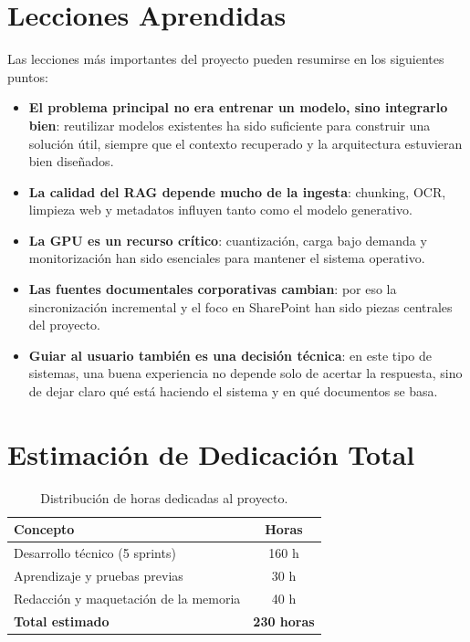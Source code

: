 \section{Lecciones Aprendidas}

Las lecciones más importantes del proyecto pueden resumirse en los siguientes puntos:

\begin{itemize}
    \item \textbf{El problema principal no era entrenar un modelo, sino integrarlo bien}: reutilizar modelos existentes ha sido suficiente para construir una solución útil, siempre que el contexto recuperado y la arquitectura estuvieran bien diseñados.
    \item \textbf{La calidad del RAG depende mucho de la ingesta}: chunking, OCR, limpieza web y metadatos influyen tanto como el modelo generativo.
    \item \textbf{La GPU es un recurso crítico}: cuantización, carga bajo demanda y monitorización han sido esenciales para mantener el sistema operativo.
    \item \textbf{Las fuentes documentales corporativas cambian}: por eso la sincronización incremental y el foco en SharePoint han sido piezas centrales del proyecto.
    \item \textbf{Guiar al usuario también es una decisión técnica}: en este tipo de sistemas, una buena experiencia no depende solo de acertar la respuesta, sino de dejar claro qué está haciendo el sistema y en qué documentos se basa.
\end{itemize}

\section{Estimación de Dedicación Total}

\begin{table}[H]
\centering
\caption{Distribución de horas dedicadas al proyecto.}
\label{tab:horas}
\begin{tabular}{lc}
\toprule
\textbf{Concepto} & \textbf{Horas} \\
\midrule
Desarrollo técnico (5 sprints) & 160 h \\
Aprendizaje y pruebas previas & 30 h \\
Redacción y maquetación de la memoria & 40 h \\
\midrule
\textbf{Total estimado} & \textbf{230 horas} \\
\bottomrule
\end{tabular}
\end{table}

